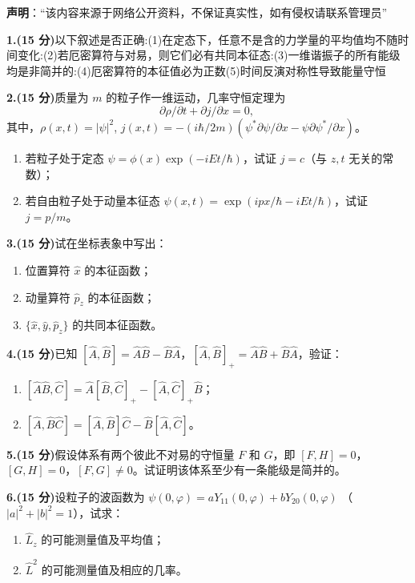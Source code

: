 
\textbf{声明}：“该内容来源于网络公开资料，不保证真实性，如有侵权请联系管理员”

\textbf{1.(15 分)}以下叙述是否正确:(1)在定态下，任意不是含的力学量的平均值均不随时间变化:(2)若厄密算符与对易，则它们必有共同本征态:(3)一维谐振子的所有能级均是非简并的:(4)厄密算符的本征值必为正数(5)时间反演对称性导致能量守恒

\textbf{2.(15 分)}质量为 $m$ 的粒子作一维运动，几率守恒定理为
\[
\partial \rho/\partial t + \partial j/\partial x = 0,~
\]
其中，$\rho(x,t) = |\psi|^2$, $j(x,t) = -(i\hbar/2m)(\psi^*\partial \psi/\partial x - \psi \partial \psi^*/\partial x)$。

\begin{enumerate}
    \item 若粒子处于定态 $\psi = \phi(x) \exp(-iEt/\hbar)$，试证 $j = c$（与 $z,t$ 无关的常数）；
    \item 若自由粒子处于动量本征态 $\psi(x,t) = \exp(ipx/\hbar - iEt/\hbar)$，试证 $j = p/m$。
\end{enumerate}

\textbf{3.(15 分)}试在坐标表象中写出：

\begin{enumerate}
    \item 位置算符 $\hat{x}$ 的本征函数；
    \item 动量算符 $\hat{p}_z$ 的本征函数；
    \item $\{\hat{x},\hat{y}, \hat{p}_z\}$ 的共同本征函数。
\end{enumerate}

\textbf{4.(15 分)}已知 $[\hat{A}, \hat{B}] = \hat{A}\hat{B} - \hat{B}\hat{A}$，$[\hat{A}, \hat{B}]_+ = \hat{A}\hat{B} + \hat{B}\hat{A}$，验证：

\begin{enumerate}
    \item $[\hat{A}\hat{B},\hat{C}] = \hat{A}[\hat{B}, \hat{C}]_{+} - [\hat{A}, \hat{C}]_{+}\hat{B}$；
    \item $[\hat{A}, \hat{B}\hat{C}] = [\hat{A}, \hat{B}]\hat{C} - \hat{B}[\hat{A}, \hat{C}]$。
\end{enumerate}

\textbf{5.(15 分)}假设体系有两个彼此不对易的守恒量 $F$ 和 $G$，即 $[F, H] = 0$，$[G, H] = 0$，$[F, G] \neq 0$。试证明该体系至少有一条能级是简并的。

\textbf{6.(15 分)}设粒子的波函数为 $\psi(0, \varphi) = aY_{11}(0, \varphi) + bY_{20}(0, \varphi)$ （$|a|^2 + |b|^2 = 1$），试求：
\begin{enumerate}
    \item  $\hat{L}_z$ 的可能测量值及平均值；
    \item  $\hat{L}^2$ 的可能测量值及相应的几率。
\end{enumerate}


